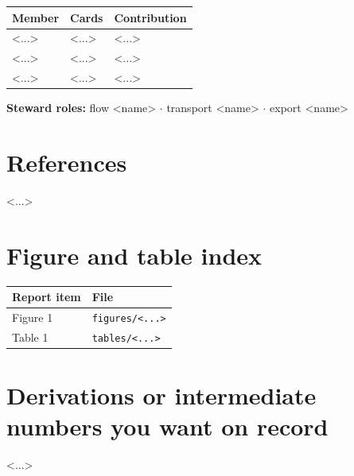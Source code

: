 \documentclass[11pt,a4paper]{article}
\begin{document}
\begin{tabularx}{\textwidth}{@{}p{}p{}Y@{}}
\toprule
Member & Cards & Contribution \\
\midrule
<...> & <...> & <...> \\
<...> & <...> & <...> \\
<...> & <...> & <...> \\
\bottomrule
\end{tabularx}
\par\medskip

\noindent\textbf{Steward roles:} flow <name> $\cdot$ transport <name> $\cdot$ export <name>

\section{References}
<...>

\clearpage
\appendix

\section{Figure and table index}

\begin{tabularx}{\textwidth}{@{}p{}Y@{}}
\toprule
Report item & File \\
\midrule
Figure 1 & \texttt{figures/<...>} \\
Table 1  & \texttt{tables/<...>} \\
\bottomrule
\end{tabularx}
\par\medskip

\section{Derivations or intermediate numbers you want on record}
<...>
\end{document}
